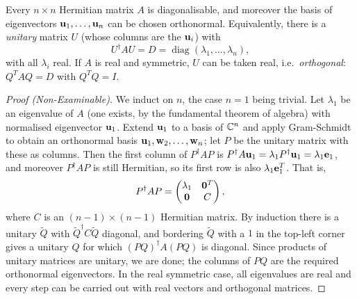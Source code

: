 \documentclass[a4paper]{scrartcl}
\newcommand{\diag}{\operatorname{diag}}
\begin{document}
\begin{theorem}\label{thm:hermitiandiag}
	Every $n \times n$ Hermitian matrix $A$ is diagonalisable, and moreover the basis of eigenvectors $\mathbf{u}_1, \dots, \mathbf{u}_n$ can be chosen orthonormal. Equivalently, there is a \emph{unitary} matrix $U$ (whose columns are the $\mathbf{u}_i$) with
	$$
	U^\dagger A U = D = \diag(\lambda_1, \dots, \lambda_n),
	$$
	with all $\lambda_i$ real. If $A$ is real and symmetric, $U$ can be taken real, i.e.\ \emph{orthogonal}: $Q^T A Q = D$ with $Q^TQ = I$.
\end{theorem}
\begin{proof}[Proof (Non-Examinable)]
	We induct on $n$, the case $n = 1$ being trivial. Let $\lambda_1$ be an eigenvalue of $A$ (one exists, by the fundamental theorem of algebra) with normalised eigenvector $\mathbf{u}_1$. Extend $\mathbf{u}_1$ to a basis of $\mathbb{C}^n$ and apply Gram-Schmidt to obtain an orthonormal basis $\mathbf{u}_1, \mathbf{w}_2, \dots, \mathbf{w}_n$; let $P$ be the unitary matrix with these as columns. Then the first column of $P^\dagger A P$ is $P^\dagger A \mathbf{u}_1 = \lambda_1 P^\dagger \mathbf{u}_1 = \lambda_1 \mathbf{e}_1$, and moreover $P^\dagger A P$ is still Hermitian, so its first row is also $\lambda_1 \mathbf{e}_1^T$. That is,
	$$
	P^\dagger A P = \begin{pmatrix}
		\lambda_1 & \mathbf{0}^T \\
		\mathbf{0} & C
	\end{pmatrix},
	$$
	where $C$ is an $(n-1) \times (n-1)$ Hermitian matrix. By induction there is a unitary $\tilde{Q}$ with $\tilde{Q}^\dagger C \tilde{Q}$ diagonal, and bordering $\tilde{Q}$ with a $1$ in the top-left corner gives a unitary $Q$ for which $(PQ)^\dagger A (PQ)$ is diagonal. Since products of unitary matrices are unitary, we are done; the columns of $PQ$ are the required orthonormal eigenvectors. In the real symmetric case, all eigenvalues are real and every step can be carried out with real vectors and orthogonal matrices.
\end{proof}
\end{document}
